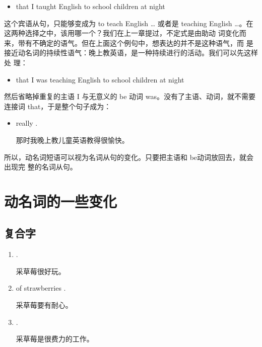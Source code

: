 \begin{itemize}
\item  that I taught English to school children at night
\end{itemize}

这个宾语从句，只能够变成为 to teach English \ldots{} 或者是 teaching
English \ldots{}。在这两种选择之中，该用哪一个？我们在上一章提过，不定式是由助动
词变化而来，带有不确定的语气。但在上面这个例句中，想表达的并不是这种语气，而
是接近动名词的持续性语气：晚上教英语，是一种持续进行的活动。我们可以先这样处
理：

\begin{itemize}
\item  that I was teaching English to school children at night
\end{itemize}

然后省略掉重复的主语 I 与无意义的 be 动词
was。没有了主语、动词，就不需要连接词 that，于是整个句子成为：

\begin{itemize}
\item {} really  .

那时我晚上教儿童英语教得很愉快。
\end{itemize}

所以，动名词短语可以视为名词从句的变化。只要把主语和 be动词放回去，就会出现完
整的名词从句。

\section{动名词的一些变化}

\subsection{复合字}

\begin{enumerate}
\item  {}  .

采草莓很好玩。
\item  {} of strawberries  .

采草莓要有耐心。
\item  {}  .

采草莓是很费力的工作。
\end{enumerate}

